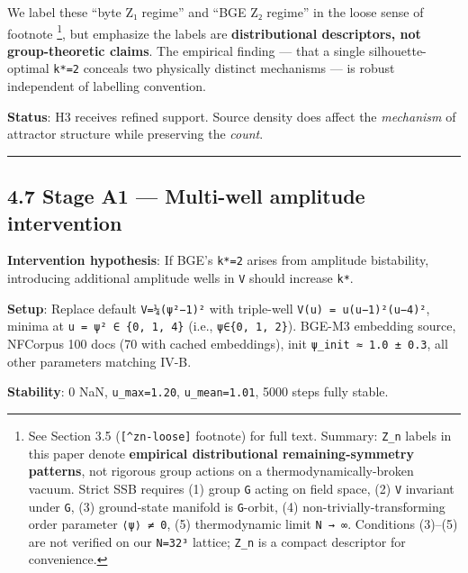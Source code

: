 \documentclass[
]{article}
\begin{document}
We label these ``byte Z₁ regime'' and ``BGE Z₂ regime'' in the loose
sense of footnote \footnote{See Section 3.5 (\texttt{{[}\^{}zn-loose{]}}
  footnote) for full text. Summary: \texttt{Z\_n} labels in this paper
  denote \textbf{empirical distributional remaining-symmetry patterns},
  not rigorous group actions on a thermodynamically-broken vacuum.
  Strict SSB requires (1) group \texttt{G} acting on field space, (2)
  \texttt{V} invariant under \texttt{G}, (3) ground-state manifold is
  \texttt{G}-orbit, (4) non-trivially-transforming order parameter
  \texttt{⟨ψ⟩\ ≠\ 0}, (5) thermodynamic limit \texttt{N\ →\ ∞}.
  Conditions (3)--(5) are not verified on our \texttt{N=32³} lattice;
  \texttt{Z\_n} is a compact descriptor for convenience.}, but emphasize
the labels are \textbf{distributional descriptors, not group-theoretic
claims}. The empirical finding --- that a single silhouette-optimal
\texttt{k*=2} conceals two physically distinct mechanisms --- is robust
independent of labelling convention.

\textbf{Status}: H3 receives refined support. Source density does affect
the \emph{mechanism} of attractor structure while preserving the
\emph{count}.

\begin{center}\rule{0.5\linewidth}{0.5pt}\end{center}

\hypertarget{stage-a1-multi-well-amplitude-intervention}{%
\subsection{4.7 Stage A1 --- Multi-well amplitude
intervention}\label{stage-a1-multi-well-amplitude-intervention}}

\textbf{Intervention hypothesis}: If BGE's \texttt{k*=2} arises from
amplitude bistability, introducing additional amplitude wells in
\texttt{V} should increase \texttt{k*}.

\textbf{Setup}: Replace default \texttt{V=¼(\textbar{}ψ\textbar{}²−1)²}
with triple-well \texttt{V(u)\ =\ u(u−1)²(u−4)²}, minima at
\texttt{u\ =\ \textbar{}ψ\textbar{}²\ ∈\ \{0,\ 1,\ 4\}} (i.e.,
\texttt{\textbar{}ψ\textbar{}∈\{0,\ 1,\ 2\}}). BGE-M3 embedding source,
NFCorpus 100 docs (70 with cached embeddings), init
\texttt{\textbar{}ψ\textbar{}\_init\ ≈\ 1.0\ ±\ 0.3}, all other
parameters matching IV-B.

\textbf{Stability}: 0 NaN, \texttt{u\_max=1.20}, \texttt{u\_mean=1.01},
5000 steps fully stable.
\end{document}
